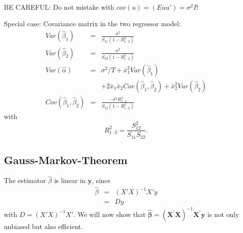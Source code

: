 \documentclass{article}
\begin{document}
BE CAREFUL: Do not mistake with $cov(u) = (Euu')=\sigma^2 I$!

Special case: Covariance matrix in the two regressor model:
\begin{eqnarray*}
Var(\hat{\beta}_{1}) &=&\frac{\sigma ^{2}}{S_{11}\left( 1-R_{1\cdot 2}^{2}\right) } \\
Var(\hat{\beta}_{2}) &=&\frac{\sigma ^{2}}{S_{22}\left( 1-R_{1\cdot 2}^{2}\right) } \\
Var\left( \hat{\alpha}\right) &=&\sigma ^{2}/T+\bar{x}_{1}^{2}Var(\hat{\beta}_{1}) \\
&&+2\bar{x}_{1}\bar{x}_{2}Cov(\hat{\beta}_{1},\hat{\beta}_{2})+\bar{x}_{2}^{2}Var(\hat{\beta}_{2}) \\
Cov(\hat{\beta}_{1},\hat{\beta}_{2}) &=&\frac{-\sigma ^{2}R_{1\cdot 2}^{2}}{S_{12}\left( 1-R_{1\cdot 2}^{2}\right) }
\end{eqnarray*}
with
\[ R_{1\cdot 2}^{2}=\frac{S_{12}^{2}}{S_{11}S_{22}}. \]

\subsection*{Gauss-Markov-Theorem}

The estimator $\hat{\beta}$ is linear in $\mathbf{y}$,
since%
\begin{eqnarray*}
\hat{\beta} &=&(X'X)^{-1}X'y \\
&=&Dy
\end{eqnarray*}
with $D=(X'X)^{-1}X'.$ 
We will now show that $\mathbf{\hat{\beta}=}\left( \mathbf{X}^{\prime }\mathbf{X}\right)
^{-1}\mathbf{X}^{\prime }\mathbf{y}$ is not only unbiased but also efficient. 
\end{document}

